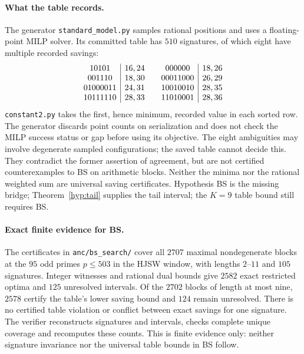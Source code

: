 \paragraph{What the table records.}
The generator \texttt{standard\_model.py} samples rational positions and uses a floating-point MILP solver.
Its committed table has $510$ signatures, of which eight have multiple recorded savings:
\[
\begin{array}{c|l@{\qquad}c|l}
10101&16,24&000000&18,26\\
001110&18,30&00011000&26,29\\
01000011&24,31&10010010&28,35\\
10111110&28,33&11010001&28,36
\end{array}
\]
\texttt{constant2.py} takes the first, hence minimum, recorded value in each sorted row.
The generator discards point counts on serialization and does not check the MILP success status or gap before using its objective.
The eight ambiguities may involve degenerate sampled configurations; the saved table cannot decide this.
They contradict the former assertion of agreement, but are not certified counterexamples to BS on arithmetic blocks.
Neither the minima nor the rational weighted sum are universal saving certificates.  Hypothesis BS is the missing bridge;
Theorem~\ref{hyp:tail} supplies the tail interval; the $K=9$ table bound still requires BS.

\paragraph{Exact finite evidence for BS.}
The certificates in \texttt{anc/bs\_search/} cover all $2707$ maximal nondegenerate blocks at the $95$ odd primes $p\le503$
in the HJSW window, with lengths $2$--$11$ and $105$ signatures.
Integer witnesses and rational dual bounds give $2582$ exact restricted optima and $125$ unresolved intervals.
Of the $2702$ blocks of length at most nine, $2578$ certify the table's lower saving bound and $124$ remain unresolved.
There is no certified table violation or conflict between exact savings for one signature.
The verifier reconstructs signatures and intervals, checks complete unique coverage and recomputes these counts.
This is finite evidence only: neither signature invariance nor the universal table bounds in BS follow.

